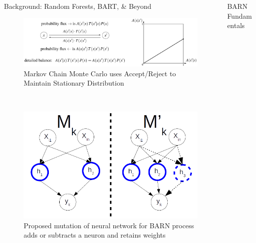 \documentclass{beamer}
\newlength{\columnheight}
\begin{document}
\begin{frame}
\begin{columns}
\begin{column}{.33\textwidth}
\begin{minipage}{.98\textwidth}
{\begin{myblock}{Background: Random Forests, BART, \& Beyond}
             \\ \vspace{-1.5em}
\begin{figure}[h]
\includegraphics{balance.png}
\caption{Markov Chain Monte Carlo uses Accept/Reject to Maintain Stationary Distribution\cite{stepanov2021math}}
\end{figure}

             \\ \vspace{-1.5em}
\begin{figure}[h]
\includegraphics{barn_trans.png}
    \caption{Proposed mutation of neural network for BARN process adds or subtracts a neuron and retains weights}
\end{figure}
		\end{myblock}
	}
	\end{minipage}
	\end{column}
	\begin{column}{.33\textwidth}
	\begin{minipage}{.98\textwidth}  %
		\parbox[t][\columnheight]{\textwidth}{ %
			\begin{myblock}{BARN Fundamentals}


\end{myblock}}
\end{minipage}
\end{column}
\end{columns}
\end{frame}
\end{document}
